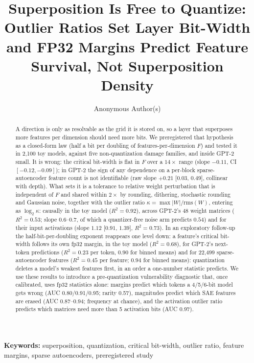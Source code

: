 \documentclass{article}
\title{Superposition Is Free to Quantize: Outlier Ratios Set Layer Bit-Width and FP32 Margins Predict Feature Survival, Not Superposition Density}
\author{Anonymous Author(s)}
\begin{document}
\nolinenumbers
\maketitle
\vspace{-10pt}
\begin{abstract}
A direction is only as resolvable as the grid it is stored on, so a layer that superposes more features per dimension
should need more bits. We preregistered
that hypothesis as a closed-form law (half a bit per doubling of features-per-dimension $F$) and tested it in 2{,}100
toy models, against five non-quantization damage families, and inside GPT-2 small. It is wrong:
the critical bit-width is flat in $F$ over a $14\times$ range (slope $-0.11$, CI $[-0.12,-0.09]$); in GPT-2 the sign of any dependence on a per-block sparse-autoencoder feature count is not identifiable (raw slope
$+0.21$ [$0.03$, $0.49$], collinear with depth). What sets it is a
tolerance to relative weight perturbation that is independent of $F$ and shared within $2\times$ by rounding, dithering,
stochastic rounding and Gaussian noise, together with the outlier ratio $\kappa=\max|W|/\mathrm{rms}(W)$, entering as
$\log_2\kappa$: causally in the toy model ($R^2=0.92$), across GPT-2's 48 weight matrices ($R^2=0.53$; slope $0.6$--$0.7$, of
which a quantizer-free noise arm predicts $0.54$) and for their input activations (slope $1.12$ [$0.91$, $1.39$], $R^2=0.73$). In an exploratory follow-up the half-bit-per-doubling exponent reappears one level down: a feature's critical
bit-width follows its own fp32 margin, in the toy model ($R^2=0.68$), for GPT-2's next-token predictions ($R^2=0.23$ per token, $0.90$ for binned means) and for 22{,}499 sparse-autoencoder features ($R^2=0.45$ per feature;
$0.94$ for binned means):
quantization deletes a model's weakest features first, in an order a one-number statistic predicts. We use these results to introduce a pre-quantization vulnerability diagnostic that,
once calibrated, uses fp32 statistics alone: margins predict which tokens a 4/5/6-bit model gets wrong (AUC 0.80/0.91/0.95; rarity 0.57), magnitudes predict which
SAE features are erased (AUC 0.87--0.94; frequency at chance), and the activation outlier ratio predicts which matrices need more
than 5 activation bits (AUC 0.97).
\end{abstract}
\begin{center}\vspace{-9pt}\small\textbf{Keywords:} superposition, quantization, critical bit-width, outlier ratio, feature margins, sparse autoencoders, preregistered study\end{center}
\end{document}
